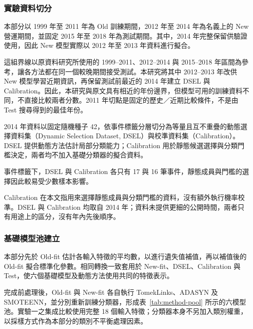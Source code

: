 \subsubsection{實驗資料切分}

本部分以 1999 年至 2011 年為 Old 訓練期間，2012 年至 2014 年為名義上的 New 營運期間，並固定 2015 年至 2018 年為測試期間。其中，2014 年完整保留供驗證使用，因此 New 模型實際以 2012 年至 2013 年資料進行擬合。

這組界線以原資料研究所使用的 1999--2011、2012--2014 與 2015--2018 年區間為參考\autocite{lombardo2022bankruptcy}，讓各方法都在同一個較晚期間接受測試。本研究將其中 2012--2013 年改供 New 模型學習近期資訊，再保留測試前最近的 2014 年建立 DSEL 與 Calibration。因此，本研究與原文具有相近的年份邊界，但模型可用的訓練資料不同，不直接比較兩者分數。2011 年切點是固定的歷史／近期比較條件，不是由 Test 搜尋得到的最佳年份。

2014 年資料以固定隨機種子 42，依事件標籤分層切分為等量且互不重疊的動態選擇資料集（Dynamic Selection Dataset, DSEL）與校準資料集（Calibration）。DSEL 提供動態方法估計局部分類能力；Calibration 用於靜態候選選擇與分類門檻決定，兩者均不加入基礎分類器的擬合資料。



事件標籤下，DSEL 與 Calibration 各只有 17 與 16 筆事件，靜態成員與門檻的選擇因此較易受少數樣本影響。

Calibration 在本文指用來選擇靜態成員與分類門檻的資料，沒有額外執行機率校準。DSEL 與 Calibration 均取自 2014 年；資料未提供更細的公開時間，兩者只有用途上的區分，沒有年內先後順序。

\subsubsection{基礎模型池建立}

本部分先於 Old-fit 估計各輸入特徵的平均數，以進行遺失值補值，再以補值後的 Old-fit 擬合標準化參數。相同轉換一致套用於 New-fit、DSEL、Calibration 與 Test，使六個基礎模型及動態方法使用共同的特徵表示。

完成前處理後，Old-fit 與 New-fit 各自執行 TomekLinks、ADASYN 及 SMOTEENN，並分別重新訓練分類器，形成表~\ref{tab:method-pool} 所示的六模型池。實驗一之集成比較使用完整 18 個輸入特徵；分類器本身不另加入類別權重，以採樣方式作為本部分的類別不平衡處理因素。

